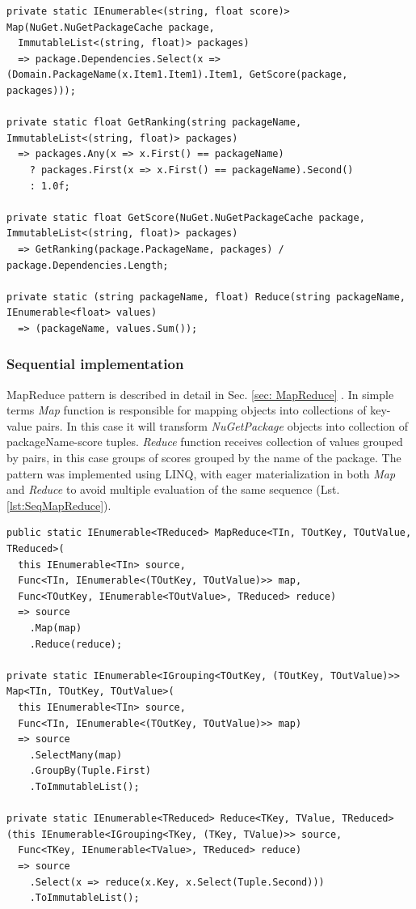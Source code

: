 \begin{lstlisting}[language={[sharp]c}, style=sharpcstyle, caption={Nuget package ranking functions}, label={lst:NugetPackageRanking}]
private static IEnumerable<(string, float score)> Map(NuGet.NuGetPackageCache package,
  ImmutableList<(string, float)> packages)
  => package.Dependencies.Select(x => (Domain.PackageName(x.Item1.Item1).Item1, GetScore(package, packages)));

private static float GetRanking(string packageName, ImmutableList<(string, float)> packages)
  => packages.Any(x => x.First() == packageName)
    ? packages.First(x => x.First() == packageName).Second()
    : 1.0f;

private static float GetScore(NuGet.NuGetPackageCache package, ImmutableList<(string, float)> packages)
  => GetRanking(package.PackageName, packages) / package.Dependencies.Length;

private static (string packageName, float) Reduce(string packageName, IEnumerable<float> values)
  => (packageName, values.Sum());
\end{lstlisting}

\subsubsection{Sequential implementation}
MapReduce pattern is described in detail in Sec. \ref{sec: MapReduce} . 
In simple terms \emph{Map} function is responsible for mapping objects into collections of key-value pairs. In this case it will transform \emph{NuGetPackage} objects into collection of packageName-score tuples. \emph{Reduce} function receives collection of values grouped by pairs, in this case groups of scores grouped by the name of the package. The pattern was implemented using LINQ, with eager materialization in both \emph{Map} and \emph{Reduce} to avoid multiple evaluation of the same sequence (Lst. \ref{lst:SeqMapReduce}).

\begin{lstlisting}[language={[sharp]c}, style=sharpcstyle, caption={Sequential MapReduce implementation}, label={lst:SeqMapReduce}]
public static IEnumerable<TReduced> MapReduce<TIn, TOutKey, TOutValue, TReduced>(
  this IEnumerable<TIn> source,
  Func<TIn, IEnumerable<(TOutKey, TOutValue)>> map,
  Func<TOutKey, IEnumerable<TOutValue>, TReduced> reduce)
  => source
    .Map(map)
    .Reduce(reduce);

private static IEnumerable<IGrouping<TOutKey, (TOutKey, TOutValue)>> Map<TIn, TOutKey, TOutValue>(
  this IEnumerable<TIn> source,
  Func<TIn, IEnumerable<(TOutKey, TOutValue)>> map)
  => source
    .SelectMany(map)
    .GroupBy(Tuple.First)
    .ToImmutableList();

private static IEnumerable<TReduced> Reduce<TKey, TValue, TReduced>
(this IEnumerable<IGrouping<TKey, (TKey, TValue)>> source,
  Func<TKey, IEnumerable<TValue>, TReduced> reduce)
  => source
    .Select(x => reduce(x.Key, x.Select(Tuple.Second)))
    .ToImmutableList();

\end{lstlisting}

